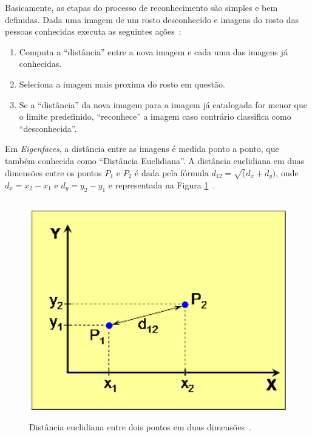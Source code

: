 Basicamente, as etapas do processo de reconhecimento são simples e bem definidas. Dada uma imagem de um rosto desconhecido e imagens do rosto das pessoas conhecidas executa as seguintes ações~\cite{hewitt}:

	\begin{enumerate}
		\item Computa a ``distância'' entre a nova imagem e cada uma das imagens já conhecidas.
		\item Seleciona a imagem mais proxima do rosto em questão.
		\item Se a ``distância'' da nova imagem para a imagem já catalogada for menor que o limite predefinido, ``reconhece'' a imagem caso contrário classifica como ``desconhecida''.
	\end{enumerate}

Em \textit{Eigenfaces}, a distância entre as imagens é medida ponto a ponto, que também conhecida como ``Distância Euclidiana''. A distância euclidiana em duas dimensões entre os pontos $P_1$ e $P_2$ é dada pela fórmula $\displaystyle d_{12} = \sqrt(d_{x} + d_{y})$, onde $\displaystyle d_x = x_2 - x_1$ e $\displaystyle d_y = y_2-y_1$ e representada na Figura \ref{distanciaEntrePontos}~\cite{hewitt}.

    \begin{figure}[hbt]
		\begin{center}
			\includegraphics[height=9.5cm,width=12.5cm]{figuras/2.FundamentacaoTeorica/graficoDistanciaEntrePontos.png}
		\end{center}
		\caption{Distância euclidiana entre dois pontos em duas dimensões~\cite{hewitt}.}
		\label{distanciaEntrePontos}
	\end{figure}


